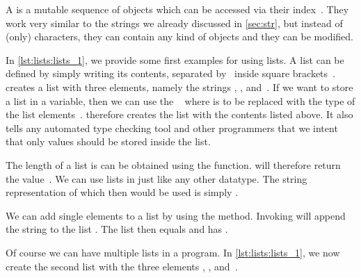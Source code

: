 %
\label{sec:lists}%
%
%
%
%
%
%
%
%
%
%
A  is a mutable sequence of objects which can be accessed via their index~\cite{PSF:P3D:TPLR:S}.
They work very similar to the strings we already discussed in \cref{sec:str}, but instead of (only) characters, they can contain any kind of objects and they can be modified.

In \cref{lst:lists:lists_1}, we provide some first examples for using lists.
A list can be defined by simply writing its contents, separated by~\pythonilIdx{,} inside square brackets~\pythonil{[...]}\pythonIdx{[\idxdots]}.
 creates a list with three elements, namely the strings , , and~.
If we want to store a list in a variable, then we can use the ~ where  is to be replaced with the type of the list elements~\cite{PEP585}.
 therefore creates the list  with the contents listed above.
It also tells any automated type checking tool and other programmers that we intent that only  values should be stored inside the list.

The length of a list is can be obtained using the  function.
 will therefore return the value~.
We can use lists in  just like any other datatype.
The string representation of  which then would be used is simply .%
%
\begin{sloppypar}%
We can add single elements to a list by using the  method.
Invoking  will append the string  to the list .
The list then equals  and has .%
\end{sloppypar}%
%
Of course we can have multiple lists in a program.
In \cref{lst:lists:lists_1}, we now create the second list  with the three elements , , and~.

